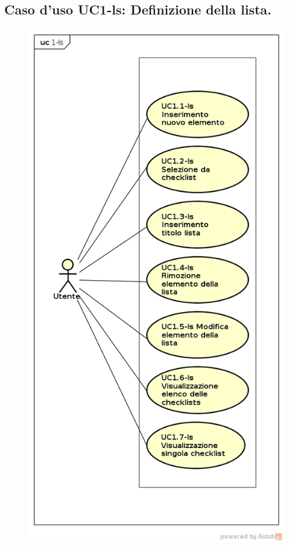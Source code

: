 \subsection{Caso d'uso UC1-ls: Definizione della lista.}
\begin{itemize}
   \FloatBarrier
   \begin{figure}[ht]
   \centering
   \includegraphics[scale=0.45]{img/lista1.png}

\end{figure}
\end{itemize}

